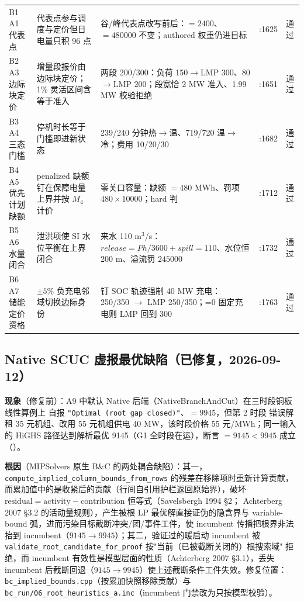 \begin{center}
\begin{longtable}{@{}L{2.7cm}L{3.4cm}L{3.9cm}L{2.5cm}L{1.9cm}@{}}
B1 A1 代表点 & 代表点参与调度与定价但日电量只积 96 点 & 谷/峰代表点改写前后：$=2400$、$=480000$ 不变；authored 权重仍进目标 & :1625 & 通过\\
B2 A3 边际块定价 & 增量段报价由边际块定价；1\% 灵活区间含等于准入 & 两段 200/300：负荷 150$\to$LMP 300、80$\to$LMP 200；段宽恰 2 MW 准入、1.99 MW 校验拒绝 & :1651 & 通过\\
B3 A4 三态门槛 & 停机时长等于门槛即进新状态 & 239/240 分钟热$\to$温、719/720 温$\to$冷；费用 10/20/30 & :1682 & 通过\\
B4 A5 优先计划缺额 & penalized 缺额钉在保障电量上界并按 $M_4$ 计价 & 零关口容量：缺额 $=480$ MWh、罚项 $480\times10000$；hard 判  & :1712 & 通过\\
B5 A6 水量闭合 & 泄洪项使 SI 水位平衡在上界闭合 & 来水 110 m$^3$/s：$release=Ph/3600+spill=110$、水位恒 200 m、溢流罚 $245000$ & :1732 & 通过\\
B6 A7 储能定价资格 & $\pm5\%$ 负充电邻域切换边际身份 & 钉 SOC 轨迹强制 40 MW 充电： 250/350 $\to$ LMP 250/350；=0 固定充电则 LMP 回到 300 & :1763 & 通过\\
\bottomrule
\end{longtable}
\end{center}

\subsection{Native SCUC 虚报最优缺陷（已修复，2026-09-12）}
\textbf{现象}（修复前）：A9 中默认 Native 后端（NativeBranchAndCut）在三时段铜板线性算例上
自报 \texttt{"Optimal (root gap closed)"}、$=9945$，但第 2 时段
错误解租 35 元机组、改用 55 元机组供电 40 MW，该时段价格 55 元/MWh；同一输入的
HiGHS 路径达到解析最优 9145（G1 全时段在运），断言
 $=9145<9945$ 成立
（）。

\textbf{根因}（MIPSolvers 原生 B\&C 的两处耦合缺陷）：其一，
\texttt{compute\_implied\_column\_bounds\_from\_rows} 的残差在移除项时重新计算贡献，
而累加值中的是收紧后的贡献（行间自引用护栏返回原始界），破坏
$\text{residual}=\text{activity}-\text{contribution}$ 恒等式（Savelsbergh 1994 §2；
Achterberg 2007 §3.2 的活动量规则），产生被根 LP 最优解直接证伪的隐含界与
variable-bound 弧，进而污染目标截断冲突/团/事件工件，使 incumbent 传播把根界非法
抬到 incumbent（$9145\to9945$）；其二，验证过的暖启动 incumbent 被
\texttt{validate\_root\_candidate\_for\_proof} 按"当前（已被截断关闭的）根搜索域"
拒绝，而 incumbent 有效性是模型层面的性质（Achterberg 2007 §3.1），丢失 incumbent
后截断回退（$9145\to9945$）使上述截断条件工件失效。修复位置：
\texttt{bc\_implied\_bounds.cpp}（按累加快照移除贡献）与
\texttt{bc\_run/06\_root\_heuristics\_a.inc}（incumbent 门禁改为只按模型校验）。

